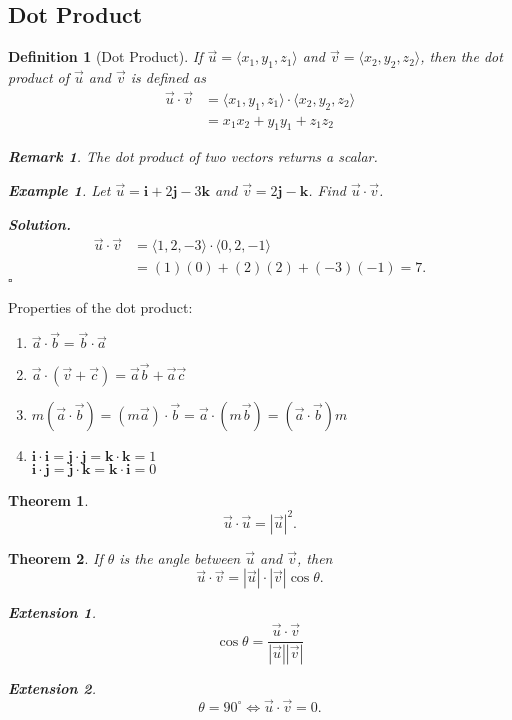 \documentclass[12pt,a4paper]{article}
\newtheorem{thm}{Theorem}[subsection]
\newtheorem{df}{Definition}[subsection]
\newtheorem{eg}{Example}[subsection]
\newenvironment*{sol}{\par\indent\textbf{Solution. }}{\hfill{$\square$}\par}
\newtheorem*{rmk}{\indent Remark}
\newtheorem*{ext}{\indent Extension}
\def\vecv{\vec{v}}
\def\vecu{\vec{u}}
\def\veca{\vec{a}}
\def\vecb{\vec{b}}
\def\vecc{\vec{c}}
\def\veci{\boldsymbol{\textbf{i}}}
\def\vecj{\boldsymbol{\textbf{j}}}
\def\veck{\boldsymbol{\textbf{k}}}
\begin{document}
\subsection{Dot Product}
\begin{df}[Dot Product]
	If $\vecu=\langle x_1,y_1,z_1\rangle$ and $\vecv=\langle x_2,y_2,z_2\rangle$, then the dot product of $\vecu$ and $\vecv$ is defined as \[\begin{aligned}
		\vecu\cdot\vecv&=\langle x_1,y_1,z_1\rangle\cdot\langle x_2,y_2,z_2\rangle\\
		&=x_1x_2+y_1y_1+z_1z_2 
	\end{aligned}\]	
	\begin{rmk} The dot product of two vectors returns a scalar. \end{rmk}
	\begin{eg}
		Let $\vecu=\veci+2\vecj-3\veck$ and $\vecv=2\vecj-\veck$. Find $\vecu\cdot\vecv$.
		\begin{sol}
			\[\begin{aligned}
			\vecu\cdot\vecv&=\langle1,2,-3\rangle\cdot\langle0,2,-1\rangle\\
				&=(1)(0)+(2)(2)+(-3)(-1)=7.
			\end{aligned}\]	
		\end{sol}
	\end{eg}
\end{df}
Properties of the dot product: 
\begin{enumerate}
	\item $\veca\cdot\vecb=\vecb\cdot\veca$
	\item $\veca\cdot(\vecv+\vecc)=\veca\vecb+\veca\vecc$
	\item $m(\veca\cdot\vecb)=(m\veca)\cdot\vecb=\veca\cdot(m\vecb)=(\veca\cdot\vecb)m$
	\item $\veci\cdot\veci=\vecj\cdot\vecj=\veck\cdot\veck=1$\\$\veci\cdot\vecj=\vecj\cdot\veck=\veck\cdot\veci=0$
\end{enumerate}
\begin{thm}
	\[\vecu\cdot\vecu=|\vecu|^2.\]	
\end{thm}
\begin{thm}
	If $\theta$ is the angle between $\vecu$ and $\vecv$, then \[\boxed{\vecu\cdot\vecv=|\vecu|\cdot|\vecv|\cos\theta}.\]
	\begin{ext} \[\cos\theta=\frac{\vecu\cdot\vecv}{|\vecu||\vecv|}\]\end{ext}
	\begin{ext} \[\theta=90^\circ\Longleftrightarrow\vecu\cdot\vecv=0.\]	\end{ext}
\end{thm}
\end{document}
